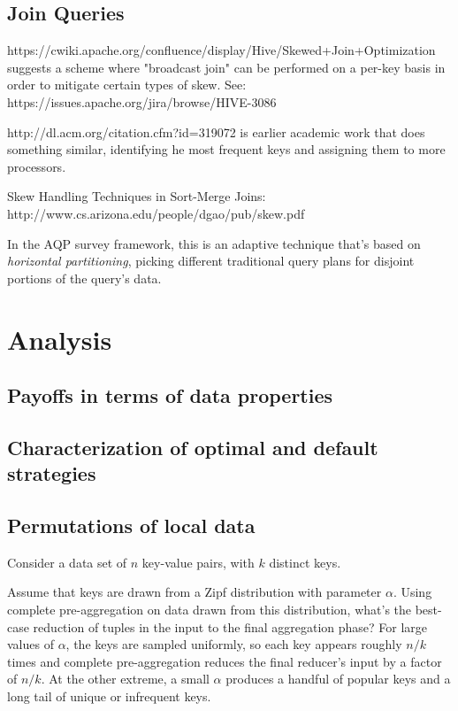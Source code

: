 \documentclass[12pt]{article}
\begin{document}
\subsection{Join Queries}

https://cwiki.apache.org/confluence/display/Hive/Skewed+Join+Optimization
suggests a scheme where "broadcast join" can be performed on a per-key basis
in order to mitigate certain types of skew.  See:
https://issues.apache.org/jira/browse/HIVE-3086

 http://dl.acm.org/citation.cfm?id=319072 is earlier academic work that does
 something similar, identifying he most frequent keys and assigning them to
 more processors.

 Skew Handling Techniques in Sort-Merge Joins: http://www.cs.arizona.edu/people/dgao/pub/skew.pdf

In the AQP survey framework, this is an adaptive technique that's based on \emph{horizontal partitioning}, picking different traditional query plans for disjoint portions of the query's data.

\pagebreak
\section{Analysis}

\subsection{Payoffs in terms of data properties}

\subsection{Characterization of optimal and default strategies}

\subsection{Permutations of local data}

Consider a data set of $n$ key-value pairs, with $k$ distinct keys.

Assume that keys are drawn from a Zipf distribution with parameter $\alpha$.
Using complete pre-aggregation on data drawn from this distribution, what's the best-case reduction of tuples in the input to the final aggregation phase?
For large values of $\alpha$, the keys are sampled uniformly, so each key appears roughly $n/k$ times and complete pre-aggregation reduces the final reducer's input by a factor of $n/k$.
At the other extreme, a small $\alpha$ produces a handful of popular keys and a long tail of unique or infrequent keys.
\end{document}
